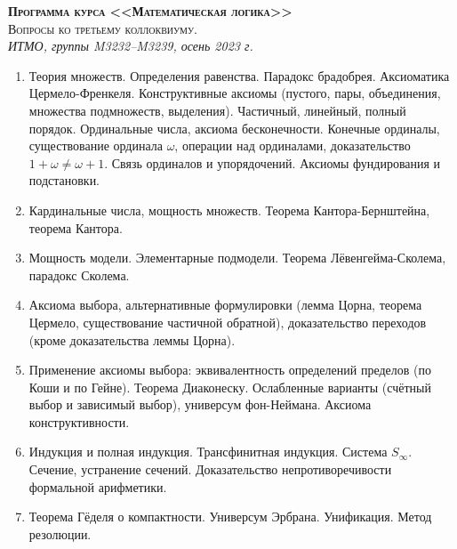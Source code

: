 \documentclass[11pt,a4paper,oneside]{scrartcl}
\begin{document}
\pagestyle{empty}

\begin{center}
{\large\scshape\bfseries Программа курса <<Математическая логика>>}\\
{\large\scshape Вопросы ко третьему коллоквиуму.}\\
\itshape ИТМО, группы M3232--M3239, осень 2023 г.
\end{center}


\begin{enumerate}
\item Теория множеств. Определения равенства. Парадокс брадобрея. Аксиоматика Цермело-Френкеля. Конструктивные аксиомы
(пустого, пары, объединения, множества подмножеств, выделения).
Частичный, линейный, полный порядок. Ординальные числа, аксиома бесконечности. 
Конечные ординалы, существование ординала $\omega$, операции над ординалами, 
доказательство $1+\omega\ne\omega+1$. Связь ординалов и упорядочений. Аксиомы фундирования и подстановки.
\item Кардинальные числа, мощность множеств. Теорема Кантора-Бернштейна, теорема Кантора. 
\item Мощность модели. Элементарные подмодели. Теорема Лёвенгейма-Сколема, парадокс Сколема.
\item Аксиома выбора, альтернативные формулировки (лемма Цорна, теорема Цермело, существование
частичной обратной), доказательство переходов (кроме доказательства леммы Цорна).
\item Применение аксиомы выбора: эквивалентность определений пределов (по Коши и по Гейне).
Теорема Диаконеску. Ослабленные варианты (счётный выбор и зависимый выбор), универсум фон-Неймана.
Аксиома конструктивности.
\item Индукция и полная индукция. Трансфинитная индукция. Система $S_\infty$. 
Сечение, устранение сечений. Доказательство непротиворечивости формальной арифметики.
\item Теорема Гёделя о компактности. Универсум Эрбрана. Унификация. Метод резолюции.
\end{enumerate}
\end{document}
